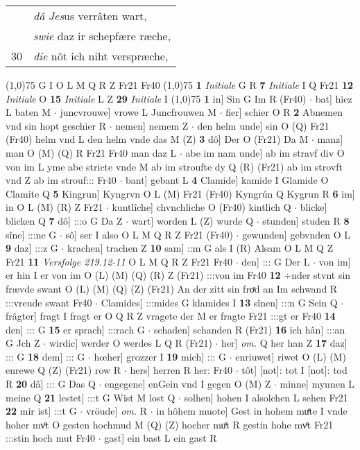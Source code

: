 \documentclass[8pt,a4paper,notitlepage]{article}
\begin{document}
\begin{table}[ht]
\begin{minipage}[t]{0.5\linewidth}
\begin{tabular}{rl}
 & \textit{dâ} \textit{Jes}us verrâten wart,\\ 
 & \textit{swie} daz ir schepfære ræche,\\ 
30 & \textit{die} nôt ich niht verspræche,\\ 
\end{tabular}
\scriptsize
\line(1,0){75} \newline
G I O L M Q R Z Fr21 Fr40 \newline
\line(1,0){75} \newline
\textbf{1} \textit{Initiale} G R  \textbf{7} \textit{Initiale} I Q Fr21  \textbf{12} \textit{Initiale} O  \textbf{15} \textit{Initiale} L Z  \textbf{29} \textit{Initiale} I  \newline
\line(1,0){75} \newline
\textbf{1} in] Sin G Im R (Fr40)  $\cdot$ bat] hiez L baten M  $\cdot$ juncvrouwe] vrowe L Juncfrouwen M  $\cdot$ fier] schier O R \textbf{2} Abnemen vnd sin hopt geschier R  $\cdot$ nemen] nemem Z  $\cdot$ den helm unde] sin O (Q) Fr21 (Fr40) helm vnd L den helm vnde das M (Z) \textbf{3} dô] Der O (Fr21) Da M  $\cdot$ manz] man O (M) (Q) R Fr21 Fr40 man daz L  $\cdot$ abe im nam unde] ab im stravf div O von im L yme abe stricte vnde M ab im stroufte dy Q (R) (Fr21) ab im strovft vnd Z ab im strouf::: Fr40  $\cdot$ bant] gebant L \textbf{4} Clamide] kamide I Glamide O Clamite Q \textbf{5} Kingrun] Kyngrvn O L (M) Fr21 (Fr40) Kyngrún Q Kygrun R \textbf{6} im] in O L (M) (R) Z Fr21  $\cdot$ kuntlîche] chvnchliche O (Fr40) kintlich Q  $\cdot$ blicke] blicken Q \textbf{7} dô] :::o G Da Z  $\cdot$ wart] worden L (Z) wurde Q  $\cdot$ stunden] studen R \textbf{8} sîne] :::ne G  $\cdot$ sô] ser I also O L M Q R Z Fr21 (Fr40)  $\cdot$ gewunden] gebvnden O L \textbf{9} daz] :::z G  $\cdot$ krachen] trachen Z \textbf{10} sam] ::m G als I (R) Alsam O L M Q Z Fr21 \textbf{11} \textit{Versfolge 219.12-11} O L M Q R Z Fr21 Fr40   $\cdot$ den] ::: G Der L  $\cdot$ von im] er hin I er von im O (L) (M) (Q) (R) Z (Fr21) :::von im Fr40 \textbf{12} ÷nder stvnt sin frævde swant O (L) (M) (Q) (Z) (Fr21) An der zitt sin froͯd an Im schwand R :::vreude swant Fr40  $\cdot$ Clamides] :::mides G klamides I \textbf{13} sînen] :::n G Sein Q  $\cdot$ frâgter] fragt I fragt er O Q R Z vragete der M er fragte Fr21 :::gt er Fr40 \textbf{14} den] ::: G \textbf{15} er sprach] :::rach G  $\cdot$ schaden] schanden R (Fr21) \textbf{16} ich hân] :::an G Jch Z  $\cdot$ wirdic] werder O werdes L Q R (Fr21)  $\cdot$ her] \textit{om.} Q her han Z \textbf{17} daz] ::: G \textbf{18} dem] ::: G  $\cdot$ hœher] grozzer I \textbf{19} mich] ::: G  $\cdot$ enriuwet] riwet O (L) (M) enrewe Q (Z) (Fr21) row R  $\cdot$ hers] herren R her: Fr40  $\cdot$ tôt] [not]: tot I [not]: tod R \textbf{20} dâ] ::: G Das Q  $\cdot$ engegene] enGein vnd I gegen O (M) Z  $\cdot$ minne] mynnen L meine Q \textbf{21} lestet] :::t G Wist M lost Q  $\cdot$ solhen] hohen I alsolchen L sehen Fr21 \textbf{22} mir ist] :::t G  $\cdot$ vröude] \textit{om.} R  $\cdot$ in hôhem muote] Gest in hohem muͤte I vnde hoher mvͦt O gesten hochmud M (Q) (Z) hocher muͦt R gestin hohe mvͦt Fr21 :::stin hoch mut Fr40  $\cdot$ gast] ein bast L ein gast R 
\end{minipage}
\end{table}
\end{document}
